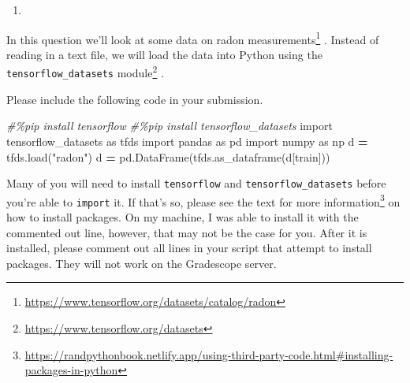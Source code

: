 \documentclass[
  12pt,
  krantz2]{krantz}
\makeatletter
\newenvironment{Shaded}{\begin{snugshade}}{\end{snugshade}}
\newcommand{\CommentTok}[1]{\textcolor[rgb]{0.37,0.37,0.37}{\textit{#1}}}
\newcommand{\ImportTok}[1]{#1}
\newcommand{\NormalTok}[1]{#1}
\newcommand{\OperatorTok}[1]{\textcolor[rgb]{0.43,0.43,0.43}{\textbf{#1}}}
\newcommand{\StringTok}[1]{\textcolor[rgb]{0.5,0.5,0.5}{#1}}
\providecommand{\tightlist}{%
  \setlength{\itemsep}{0pt}\setlength{\parskip}{0pt}}
\renewcommand{\href}[2]{#2\footnote{\url{#1}}}
\newenvironment{kframe}{%
\medskip{}
\setlength{\fboxsep}{.8em}
 \def\at@end@of@kframe{}%
 \ifinner\ifhmode%
  \def\at@end@of@kframe{\end{minipage}}%
  \begin{minipage}{\columnwidth}%
 \fi\fi%
 \def\FrameCommand##1{\hskip\@totalleftmargin \hskip-\fboxsep
 \colorbox{shadecolor}{##1}\hskip-\fboxsep
     \hskip-\linewidth \hskip-\@totalleftmargin \hskip\columnwidth}%
 \MakeFramed {\advance\hsize-\width
   \@totalleftmargin\z@ \linewidth\hsize
   \@setminipage}}%
 {\par\unskip\endMakeFramed%
 \at@end@of@kframe}
\renewenvironment{Shaded}{\begin{kframe}}{\end{kframe}}
\makeatother
\begin{document}
\begin{enumerate}
\def\labelenumi{\arabic{enumi}.}
\setcounter{enumi}{1}
\tightlist
\item
\end{enumerate}

In this question we'll look at \href{https://www.tensorflow.org/datasets/catalog/radon}{some data on radon measurements} \citep{GelmanHill:2007}. Instead of reading in a text file, we will load the data into Python using the \href{https://www.tensorflow.org/datasets}{\texttt{tensorflow\_datasets} module} \citep{TFDS}.

Please include the following code in your submission.

\begin{Shaded}
\begin{Highlighting}[]
\CommentTok{\#\%pip install tensorflow}
\CommentTok{\#\%pip install tensorflow\_datasets}
\ImportTok{import}\NormalTok{ tensorflow\_datasets }\ImportTok{as}\NormalTok{ tfds}
\ImportTok{import}\NormalTok{ pandas }\ImportTok{as}\NormalTok{ pd}
\ImportTok{import}\NormalTok{ numpy }\ImportTok{as}\NormalTok{ np}
\NormalTok{d }\OperatorTok{=}\NormalTok{ tfds.load(}\StringTok{"radon"}\NormalTok{)}
\NormalTok{d }\OperatorTok{=}\NormalTok{ pd.DataFrame(tfds.as\_dataframe(d[}\StringTok{\textquotesingle{}train\textquotesingle{}}\NormalTok{]))}
\end{Highlighting}
\end{Shaded}

Many of you will need to install \texttt{tensorflow} and \texttt{tensorflow\_datasets} before you're able to \texttt{import} it. If that's so, please see the \href{https://randpythonbook.netlify.app/using-third-party-code.html\#installing-packages-in-python}{text for more information} on how to install packages. On my machine, I was able to install it with the commented out line, however, that may not be the case for you. After it is installed, please comment out all lines in your script that attempt to install packages. They will not work on the Gradescope server.
\end{document}
